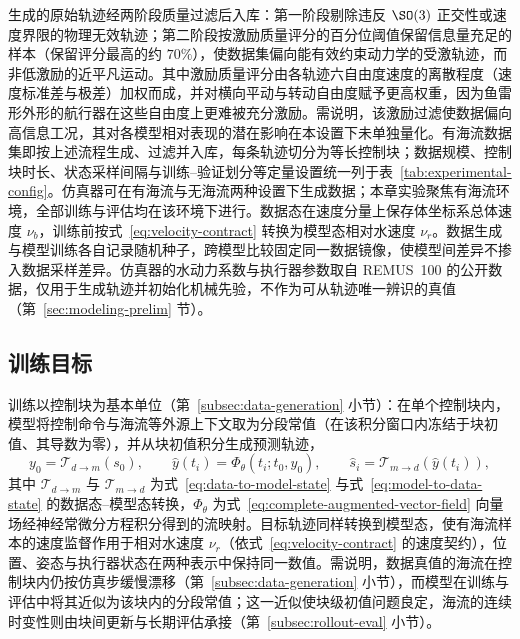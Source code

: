 生成的原始轨迹经两阶段质量过滤后入库：第一阶段剔除违反 \(\SO(3)\) 正交性或速度界限的物理无效轨迹；第二阶段按激励质量评分的百分位阈值保留信息量充足的样本（保留评分最高的约 \(70\%\)），使数据集偏向能有效约束动力学的受激轨迹，而非低激励的近平凡运动。其中激励质量评分由各轨迹六自由度速度的离散程度（速度标准差与极差）加权而成，并对横向平动与转动自由度赋予更高权重，因为鱼雷形外形的航行器在这些自由度上更难被充分激励。需说明，该激励过滤使数据偏向高信息工况，其对各模型相对表现的潜在影响在本设置下未单独量化。有海流数据集即按上述流程生成、过滤并入库，每条轨迹切分为等长控制块；数据规模、控制块时长、状态采样间隔与训练--验证划分等定量设置统一列于表~\ref{tab:experimental-config}。仿真器可在有海流与无海流两种设置下生成数据；本章实验聚焦有海流环境，全部训练与评估均在该环境下进行。数据态在速度分量上保存体坐标系总体速度 \(\nu_b\)，训练前按式~\eqref{eq:velocity-contract} 转换为模型态相对水速度 \(\nu_r\)。数据生成与模型训练各自记录随机种子，跨模型比较固定同一数据镜像，使模型间差异不掺入数据采样差异。仿真器的水动力系数与执行器参数取自 REMUS~100 的公开数据，仅用于生成轨迹并初始化机械先验，不作为可从轨迹唯一辨识的真值（第~\ref{sec:modeling-prelim} 节）。

\subsection{训练目标}
\label{subsec:training-objective}

训练以控制块为基本单位（第~\ref{subsec:data-generation} 小节）：在单个控制块内，模型将控制命令与海流等外源上下文取为分段常值（在该积分窗口内冻结于块初值、其导数为零），并从块初值积分生成预测轨迹，
\begin{equation}
  y_0=\mathcal{T}_{d\to m}(s_0),\qquad
  \hat y(t_i)=\Phi_\theta(t_i;t_0,y_0),\qquad
  \hat s_i=\mathcal{T}_{m\to d}(\hat y(t_i)),
  \label{eq:block-prediction}
\end{equation}
其中 \(\mathcal{T}_{d\to m}\) 与 \(\mathcal{T}_{m\to d}\) 为式~\eqref{eq:data-to-model-state} 与式~\eqref{eq:model-to-data-state} 的数据态--模型态转换，\(\Phi_\theta\) 为式~\eqref{eq:complete-augmented-vector-field} 向量场经神经常微分方程积分得到的流映射。目标轨迹同样转换到模型态，使有海流样本的速度监督作用于相对水速度 \(\nu_r\)（依式~\eqref{eq:velocity-contract} 的速度契约），位置、姿态与执行器状态在两种表示中保持同一数值。需说明，数据真值的海流在控制块内仍按仿真步缓慢漂移（第~\ref{subsec:data-generation} 小节），而模型在训练与评估中将其近似为该块内的分段常值；这一近似使块级初值问题良定，海流的连续时变性则由块间更新与长期评估承接（第~\ref{subsec:rollout-eval} 小节）。

